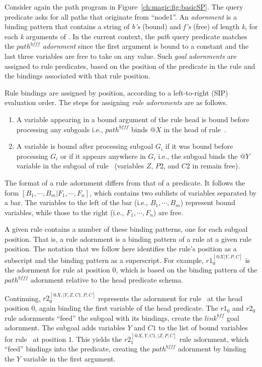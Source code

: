 Consider again the path program in Figure~\ref{ch:magic:fig:basicSP}.  The
query predicate  asks for all paths that originate
from ``node1''.  An {\em adornment} is a binding pattern that contains a string
of {\em b's} (bound) and {\em f's} (free) of length {\em k}, for each {\em k}
arguments of .  In the current context, the {\em path} query predicate
matches the $path^{bfff}$ {\em adornment} since the first argument is bound to
a constant and the last three variables are free to take on any value.  Such
{\em goal adornments} are assigned to rule predicates, based on the position of
the predicate in the rule and the bindings associated with that rule position.

Rule bindings are assigned by position, according to a left-to-right (SIP)
evaluation order.  The steps for assigning {\em rule adornments} are as
follows.
\begin{enumerate}
    \ssp
    \item A variable appearing in a bound argument of the rule head is bound 
      before processing any subgoals i.e., $path^{bfff}$ binds $@X$ in the 
       head of rule~.
    \item A variable is bound after processing subgoal $G_i$ if it was bound 
          before processing $G_i$ or if it appears anywhere in $G_i$ i.e.,
	  the  subgoal binds the $@Y$ variable in the  subgoal
	  of rule~ (variables $Z$, $P2$, and $C2$ in  remain free).
\end{enumerate}
The format of a rule adornment differs from that of a predicate.  It follows the form
$[B_1,\cdots,B_m|F_1,\cdots,F_n]$, which contains two sublists of variables
separated by a bar.  The variables to the left of the bar (i.e.,
$B_1,\cdots,B_m$) represent bound variables, while those to the right (i.e.,
$F_1,\cdots,F_n$) are free. 

A given rule contains a number of these binding patterns, one for each subgoal
position.  That is, a rule adornment is a binding pattern of a rule at a given
rule position.  The notation that we follow here identifies the rule's position
as a subscript and the binding pattern as a superscript.  For example,
$r1_0^{[@X|Y,P,C]}$ is the adornment for rule  at position $0$, which is
based on the binding pattern of the $path^{bfff}$ adornment relative to the
head predicate schema.

Continuing, $r2_0^{[@X,|Y,Z,C1,P,C]}$ represents the adornment for rule~
at the head position $0$, again binding the first variable of the head
predicate.  The $r1_0$ and $r2_0$ rule adornments ``feed'' the 
subgoal with its bindings, create the $link^{bff}$ goal adornment.  The
 subgoal adds variables $Y$ and $C1$ to the list of bound variables
for rule~ at position $1$.  This yields the $r2_1^{[@X,Y,C1,|Z,P,C]}$
rule adornment, which ``feed'' bindings into the  predicate, creating
the $path^{bfff}$ adornment by binding the $Y$ variable in the first argument.

